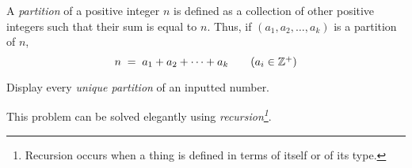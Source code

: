 

\problem A {\em partition} of a positive integer $n$ is defined as a collection of other positive integers such that
their sum is equal to $n$. Thus, if $(a_1, a_2, \dots, a_k)$ is a partition of $n$,
\begin{equation*}
	n	\;=\;	a_1 + a_2 + \dots + a_k 			\tag{$a_i \in \mathbb{Z}^{+}$}
\end{equation*}

Display every {\em unique partition} of an inputted number.

\solution This problem can be solved elegantly using {\em recursion\footnote{Recursion occurs when a thing is defined in terms of itself or of its type.}}.

\sourcecode
